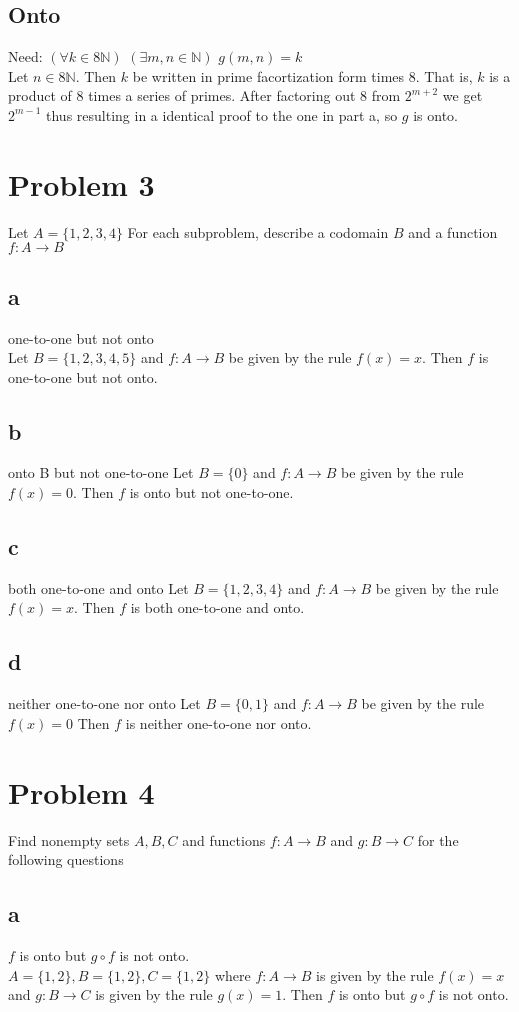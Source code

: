 \documentclass{article}
\begin{document}
\subsection*{Onto}
Need: $(\forall k \in 8\mathbb{N})$ $(\exists m, n \in \mathbb{N})$ $g(m, n) = k$ \\
Let $n \in 8\mathbb{N}$. Then $k$ be written in prime facortization form times 8. That is, $k$ is a product of 8 times a series of primes. After factoring out 8 from $2^{m+2}$ we get $2^{m-1}$ thus resulting in a identical proof to the one in part a, so $g$ is onto.
\section*{Problem 3}
Let $A = \{1,2,3,4\} $ For each subproblem, describe a codomain $B$ and a function $f:A \rightarrow B$
\subsection*{a}
one-to-one but not onto\\
Let $B = \{1,2,3,4,5\}$ and $f: A \rightarrow B$ be given by the rule $f(x) = x$. Then $f$ is one-to-one but not onto.
\subsection*{b}
onto B but not one-to-one
Let $B = \{ 0 \}$ and $f: A \rightarrow B$ be given by the rule $f(x) = 0$. Then $f$ is onto but not one-to-one.
\subsection*{c}
both one-to-one and onto
Let $B = \{1,2,3,4\}$ and $f: A \rightarrow B$ be given by the rule $f(x) = x$. Then $f$ is both one-to-one and onto.
\subsection*{d}
neither one-to-one nor onto
Let $B = \{ 0, 1\}$ and $f: A \rightarrow B$ be given by the rule $f(x) = 0$ Then $f$ is neither one-to-one nor onto.
\section*{Problem 4}
Find nonempty sets $A,B,C$ and functions $f: A \rightarrow B$ and $g: B \rightarrow C$ for the following questions
\subsection*{a}
$f$ is onto but $g \circ f$ is not onto.\\
$A = \{1, 2\}, B = \{1,2\}, C = \{1,2\} $ where $f: A \rightarrow B$ is given by the rule $f(x) = x$ and $g: B \rightarrow C$ is given by the rule $g(x) = 1$. Then $f$ is onto but $g \circ f$ is not onto.
\end{document}
